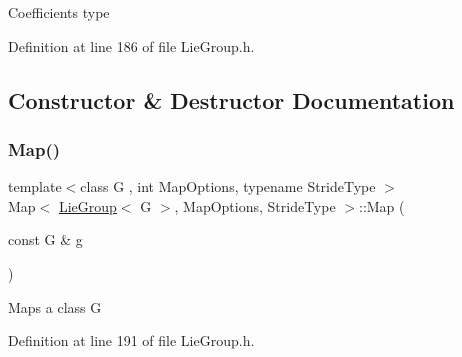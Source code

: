 Coefficients type 

Definition at line 186 of file Lie\+Group.\+h.



\subsection{Constructor \& Destructor Documentation}
\hypertarget{class_map_3_01_lie_group_3_01_g_01_4_00_01_map_options_00_01_stride_type_01_4_a141753f9a4186911b53b5b25cfd716ed}{}\label{class_map_3_01_lie_group_3_01_g_01_4_00_01_map_options_00_01_stride_type_01_4_a141753f9a4186911b53b5b25cfd716ed} 
\subsubsection{\texorpdfstring{Map()}{Map()}\hspace{0.1cm}{\footnotesize\ttfamily [1/4]}}
{\footnotesize\ttfamily template$<$class G , int Map\+Options, typename Stride\+Type $>$ \\
Map$<$ \hyperlink{class_lie_group}{Lie\+Group}$<$ G $>$, Map\+Options, Stride\+Type $>$\+::Map (\begin{DoxyParamCaption}\item[{const G \&}]{g }\end{DoxyParamCaption})\hspace{0.3cm}{\ttfamily [inline]}}

Maps a class G 

Definition at line 191 of file Lie\+Group.\+h.

\hypertarget{class_map_3_01_lie_group_3_01_g_01_4_00_01_map_options_00_01_stride_type_01_4_a33f366f2a0c009b10b35c531ee71dcb9}{}\label{class_map_3_01_lie_group_3_01_g_01_4_00_01_map_options_00_01_stride_type_01_4_a33f366f2a0c009b10b35c531ee71dcb9} 
